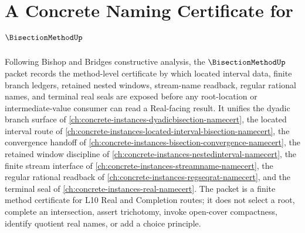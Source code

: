 \chapter{A Concrete Naming Certificate for $\BisectionMethodUp$}
\label{ch:concrete-instances-bisection-method-namecert}

Following Bishop and Bridges constructive analysis, the $\BisectionMethodUp$ packet records the method-level certificate by which located interval data, finite branch ledgers, retained nested windows, stream-name readback, regular rational names, and terminal real seals are exposed before any root-location or intermediate-value consumer can read a Real-facing result. It unifies the dyadic branch surface of \autoref{ch:concrete-instances-dyadicbisection-namecert}, the located interval route of \autoref{ch:concrete-instances-located-interval-bisection-namecert}, the convergence handoff of \autoref{ch:concrete-instances-bisection-convergence-namecert}, the retained window discipline of \autoref{ch:concrete-instances-nestedinterval-namecert}, the finite stream interface of \autoref{ch:concrete-instances-streamname-namecert}, the regular rational readback of \autoref{ch:concrete-instances-regseqrat-namecert}, and the terminal seal of \autoref{ch:concrete-instances-real-namecert}. The packet is a finite method certificate for L10 Real and Completion routes; it does not select a root, complete an intersection, assert trichotomy, invoke open-cover compactness, identify quotient real names, or add a choice principle.

